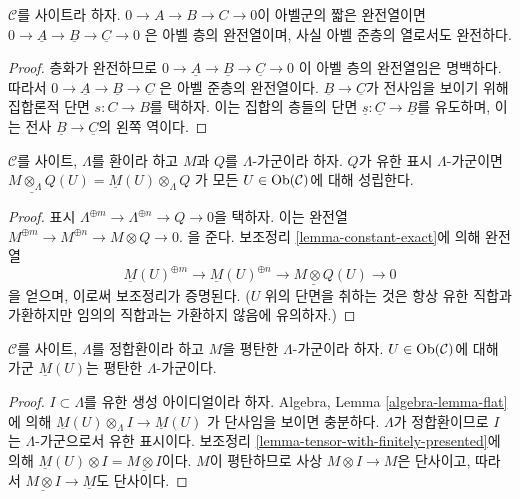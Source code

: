 \begin{lemma}
\label{lemma-constant-exact}
$\mathcal{C}$를 사이트라 하자. $0 \to A \to B \to C \to 0$이
아벨군의 짧은 완전열이면
$0 \to \underline{A} \to \underline{B} \to \underline{C} \to 0$
은 아벨 층의 완전열이며, 사실 아벨 준층의 열로서도 완전하다.
\end{lemma}

\begin{proof}
층화가 완전하므로
$0 \to \underline{A} \to \underline{B} \to \underline{C} \to 0$
이 아벨 층의 완전열임은 명백하다. 따라서
$0 \to \underline{A} \to \underline{B} \to \underline{C}$
은 아벨 준층의 완전열이다. $\underline{B} \to \underline{C}$가
전사임을 보이기 위해 집합론적 단면 $s : C \to B$를 택하자.
이는 집합의 층들의 단면 $\underline{s} : \underline{C} \to \underline{B}$를
유도하며, 이는 전사 $\underline{B} \to \underline{C}$의 왼쪽 역이다.
\end{proof}

\begin{lemma}
\label{lemma-tensor-with-finitely-presented}
$\mathcal{C}$를 사이트, $\Lambda$를 환이라 하고 $M$과 $Q$를
$\Lambda$-가군이라 하자. $Q$가 유한 표시 $\Lambda$-가군이면
$\underline{M \otimes_\Lambda Q}(U) = \underline{M}(U) \otimes_\Lambda Q$
가 모든 $U \in \mathop{\mathrm{Ob}}\nolimits(\mathcal{C})$에 대해 성립한다.
\end{lemma}

\begin{proof}
표시 $\Lambda^{\oplus m} \to \Lambda^{\oplus n} \to Q \to 0$을 택하자.
이는 완전열
$M^{\oplus m} \to M^{\oplus n} \to M \otimes Q \to 0$.
을 준다. 보조정리 \ref{lemma-constant-exact}에 의해 완전열
$$
\underline{M}(U)^{\oplus m} \to
\underline{M}(U)^{\oplus n} \to
\underline{M \otimes Q}(U) \to 0
$$
을 얻으며, 이로써 보조정리가 증명된다. ($U$ 위의 단면을 취하는 것은
항상 유한 직합과 가환하지만 임의의 직합과는 가환하지 않음에 유의하자.)
\end{proof}

\begin{lemma}
\label{lemma-flat-sections}
$\mathcal{C}$를 사이트, $\Lambda$를 정합환이라 하고 $M$을 평탄한
$\Lambda$-가군이라 하자. $U \in \mathop{\mathrm{Ob}}\nolimits(\mathcal{C})$에 대해 가군
$\underline{M}(U)$는 평탄한 $\Lambda$-가군이다.
\end{lemma}

\begin{proof}
$I \subset \Lambda$를 유한 생성 아이디얼이라 하자. Algebra, Lemma
\ref{algebra-lemma-flat}에 의해
$\underline{M}(U) \otimes_\Lambda I \to \underline{M}(U)$
가 단사임을 보이면 충분하다. $\Lambda$가 정합환이므로 $I$는
$\Lambda$-가군으로서 유한 표시이다. 보조정리
\ref{lemma-tensor-with-finitely-presented}에 의해
$\underline{M}(U) \otimes I = \underline{M \otimes I}$이다.
$M$이 평탄하므로 사상 $M \otimes I \to M$은 단사이고, 따라서
$\underline{M \otimes I} \to \underline{M}$도 단사이다.
\end{proof}

